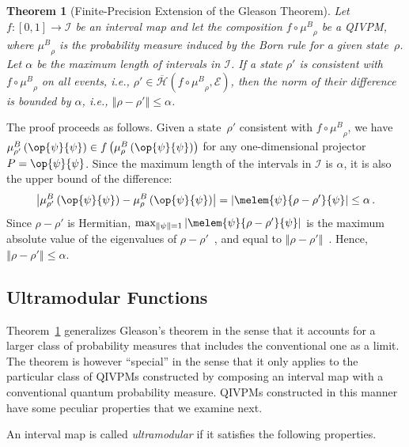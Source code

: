 \documentclass[english,reprint, aps, prl,superscriptaddress, showpacs,
showkeys, longbibliography, amsmath, amssymb, floatfix]{revtex4-1}
\theoremstyle{plain}
\newtheorem{thm}{Theorem}
\theoremstyle{definition}
\newcommand{\Hilb}{\mathcal{H}}
\newcommand{\events}{\ensuremath{\mathcal{E}}}
\newcommand{\proj}[1]{\op{#1}{#1}}
\newcommand{\coreBorn}{\ensuremath{\overline{\Hilb}}}
\newcommand{\muB}{\ensuremath{\mu^{B}}}
\begin{document}
\begin{thm}[Finite-Precision Extension of the Gleason Theorem]\label{thm:Finite-precision-Gleason}Let
$f:\left[0,1\right]\rightarrow\mathscr{I}$ be a{\color{red}n} interval map
and let {\color{red}the composition} $f\circ\muB_{\rho}$ be a QIVPM, where
$\muB_{\rho}$ is the
probability measure induced by the Born rule for a given state~$\rho$.
Let $\alpha$ be the maximum length of intervals in $\mathscr{I}$.
If a state $\rho'$ is consistent with $f\circ\muB_{\rho}$ on all
events, i.e., $\rho'\in\coreBorn\left(f\circ\muB_{\rho},\events\right)$,
then the norm of their difference is bounded by $\alpha$, i.e., $\left\Vert \rho-\rho'\right\Vert \le\alpha$.\end{thm}

The proof proceeds as follows. Given a state~$\rho'$ consistent
with $f\circ\muB_{\rho}$, we have $\muB_{\rho'}\left(\proj{\psi}\right)\in f\left(\muB_{\rho}\left(\proj{\psi}\right)\right)$
for any one-dimensional projector $P=\proj{\psi}$. Since the maximum
length of the intervals in $\mathscr{I}$ is $\alpha$, it is also
the upper bound of the difference: 
\[
\left|\muB_{\rho'}\left(\proj{\psi}\right)-\muB_{\rho}\left(\proj{\psi}\right)\right|=\left|\melem{\psi}{\rho-\rho'}{\psi}\right|\le\alpha\,.
\]
Since $\rho-\rho'$ is Hermitian, $\max_{\left\Vert \psi\right\Vert =1}\left|\melem{\psi}{\rho-\rho'}{\psi}\right|$
is the maximum absolute value of the eigenvalues of $\rho-\rho'$~\cite{544199},
and equal to $\left\Vert \rho-\rho'\right\Vert $~\cite{GolubVanLoan1996,Foucart2012}.
Hence, $\left\Vert \rho-\rho'\right\Vert \le\alpha$.

{\color{red}\subsection{Ultramodular Functions}}

Theorem~\ref{thm:Finite-precision-Gleason} generalizes Gleason's
theorem in the sense that it accounts for a larger class of probability measures that includes
the conventional one as a limit. The theorem is however ``special'' in
the sense that it only applies to the particular class of QIVPMs
constructed by composing a{\color{red}n} interval map with a conventional
quantum probability measure. QIVPMs constructed in this manner have
some peculiar properties that we examine next.

A{\color{red}n} interval map is called \emph{ultramodular} if it satisfies
the following properties.
\end{document}
